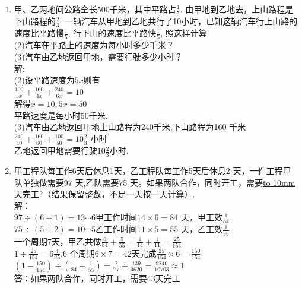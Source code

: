 \documentclass[12pt,oneside,a4paper]{ctexbook} %
\numberwithin{chapter}{part}
\begin{document}
\begin{enumerate}
\item 
甲、乙两地间公路全长500千米，其中平路占$\frac{1}{5}$. 由甲地到乙地去，上山路程是下山路程的$\frac{2}{3}$. 一辆汽车从甲地到乙地共行了10小时，已知这辆汽车行上山路的速度比平路慢$\frac{1}{5}$, 行下山的速度比平路快$\frac{1}{5}$, 照这样计算:\\
(2)汽车在平路上的速度为每小时多少千米？\\
(3)汽车由乙地返回甲地，需要行驶多少小时？\\
解:\\
(2)设平路速度为$5x$则有\\
$\frac{100}{5x}+\frac{160}{4x}+\frac{240}{6x}=10$\\
解得$x=10,5x=50$\\
平路速度是每小时50千米.\\
(3)汽车由乙地返回甲地上山路程为240千米,下山路程为160 千米\\
$\frac{240}{40}+\frac{160}{60}+\frac{100}{50}=10\frac{2}{3}$ 小时\\
乙地返回甲地需要行驶$10\frac{2}{3}$小时.

\item 
甲工程队每工作6天后休息1天，乙工程队每工作5天后休息2 天，一件工程甲队单独做需要97 天,乙队需要75 天。如果两队合作，同时开工，需要\underline{\hbox to 10mm{}} 天完工?（结果保留整数，不足一天按一天计算）.\\
解：\\
$97\div(6+1)=13\cdots6$甲工作时间$14\times6=84$ 天，甲工效$\frac{1}{84}$\\
$75\div(5+2)=10\cdots5$乙工作时间$11\times5=55$ 天，乙工效$\frac{1}{55}$\\
一个周期7天，甲乙共做$\frac{6}{84}+\frac{5}{55}=\frac{1}{14}+\frac{1}{11}=\frac{25}{154}$\\
$1\div\frac{25}{154}=6\frac{4}{25}$,6 个周期$6\times7=42$天完成$\frac{25}{154}\times6=\frac{150}{154}$\\
$(1-\frac{150}{154})\div(\frac{1}{84}+\frac{1}{55})=\frac{2}{77}\div\frac{139}{4620}=\frac{9240}{10703}\approx1$\\
答：如果两队合作，同时开工，需要43天完工


\end{enumerate}
\end{document}
